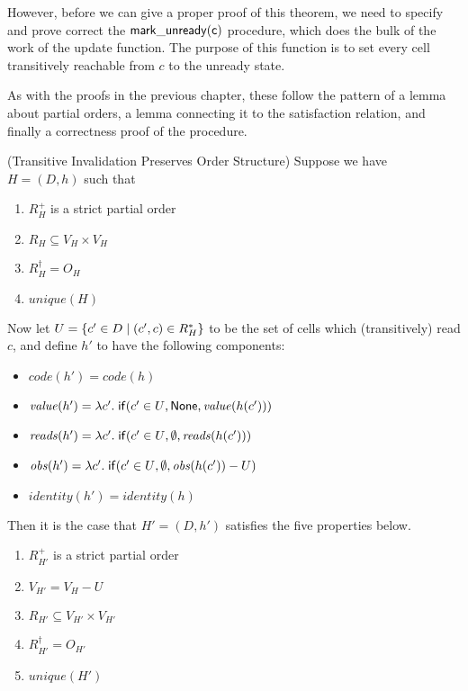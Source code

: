However, before we can give a proper proof of this theorem, we need to
specify and prove correct the $\mathsf{mark\_unready(c)}$ procedure,
which does the bulk of the work of the update function. The purpose of
this function is to set every cell transitively reachable from $c$ to
the unready state.

As with the proofs in the previous chapter, these follow the pattern 
of a lemma about partial orders, a lemma connecting it to the satisfaction
relation, and finally a correctness proof of the procedure. 


\begin{lemma}{(Transitive Invalidation Preserves Order Structure)}
Suppose we have $H = (D,h)$ such that 
\begin{enumerate}
\item $R^+_H$ is a strict partial order 
\item $R_H \subseteq V_H \times V_H$
\item $R^\dagger_H = O_H$ 
\item $\mathit{unique}(H)$
\end{enumerate}

Now let $U = \{{{c' \in D}\;|\;{(c',c) \in R^*_H}}\}$ to be the set of
cells which (transitively) read $c$, and define $h'$ to have the
following components:

\begin{itemize}
\item $\mathit{code}(h') = \mathit{code}(h)$
\item $\mathit{value}(h') = \lambda c'.\;\mathsf{if}({c'\in U}, {\mathsf{None}}, {\mathit{value}(h(c'))})$
\item $\mathit{reads}(h') = \lambda c'.\;\mathsf{if}({c'\in U}, {\emptyset}, {\mathit{reads}(h(c'))})$
\item $\mathit{obs}(h') = \lambda c'.\;\mathsf{if}({c'\in U}, {\emptyset}, {\mathit{obs}(h(c')) - U})$
\item $\mathit{identity}(h') = \mathit{identity}(h)$
\end{itemize}

\noindent Then it is the case that $H' = (D,h')$ satisfies the five properties below. 
\begin{enumerate}
\item $R^+_{H'}$ is a strict partial order 
\item $V_{H'} = V_H - U$
\item $R_{H'} \subseteq V_{H'} \times V_{H'}$
\item $R^\dagger_{H'} = O_{H'}$ 
\item $\mathit{unique}(H')$
\end{enumerate}
\end{lemma}

